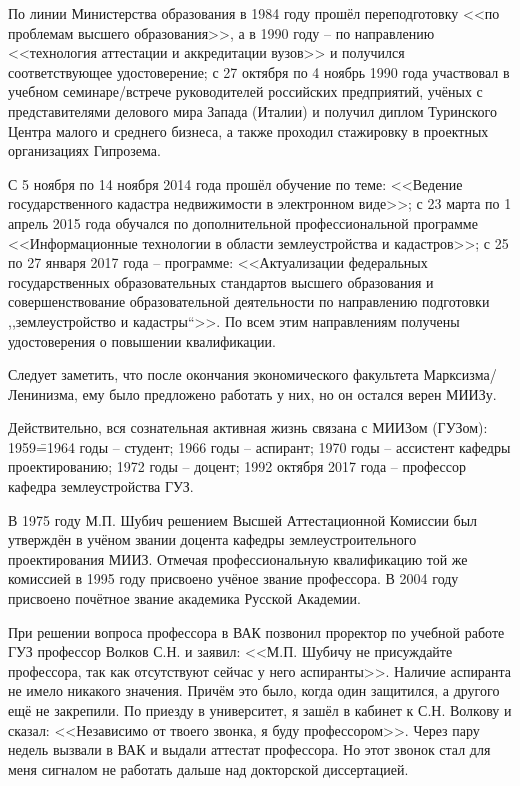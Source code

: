 По линии Министерства образования в 1984 году прошёл переподготовку <<по проблемам высшего образования>>, а в 1990 году \--- по направлению <<технология аттестации и аккредитации вузов>> и получился соответствующее удостоверение; с 27 октября по 4 ноябрь 1990 года участвовал в учебном семинаре\-/встрече руководителей российских предприятий, учёных с представителями делового мира Запада (Италии) и получил диплом Туринского Центра малого и среднего бизнеса, а также проходил стажировку в проектных организациях Гипрозема.

С 5 ноября по 14 ноября 2014 года прошёл обучение по теме: <<Ведение государственного кадастра недвижимости в электронном виде>>; с 23 марта по 1 апрель 2015 года обучался по дополнительной профессиональной программе <<Информационные технологии в области землеустройства и кадастров>>; с 25 по 27 января 2017 года \--- программе: <<Актуализации федеральных государственных образовательных стандартов высшего образования и совершенствование образовательной деятельности по направлению подготовки ,,землеустройство и кадастры``>>. По всем этим направлениям получены удостоверения о повышении квалификации. 

Следует заметить, что после окончания экономического факультета Марксизма\-/Ленинизма, ему было предложено работать у них, но он остался верен МИИЗу.

Действительно, вся сознательная активная жизнь связана с МИИЗом (ГУЗом): 1959\==1964 годы \--- студент; 1966 годы \--- аспирант; 1970 годы \--- ассистент кафедры проектированию; 1972 годы \--- доцент; 1992 октября 2017 года \--- профессор кафедра землеустройства ГУЗ.

В 1975 году М.П. Шубич решением Высшей Аттестационной Комиссии был утверждён в учёном звании доцента кафедры землеустроительного проектирования МИИЗ. Отмечая профессиональную квалификацию той же комиссией в 1995 году присвоено учёное звание профессора. В 2004 году присвоено почётное звание академика Русской Академии.

При решении вопроса профессора в ВАК позвонил проректор по учебной работе ГУЗ профессор Волков С.Н. и заявил: <<М.П. Шубичу не присуждайте профессора, так как отсутствуют сейчас у него аспиранты>>. Наличие аспиранта не имело никакого значения. Причём это было, когда один защитился, а другого ещё не закрепили. По приезду в университет, я зашёл в кабинет к С.Н. Волкову и сказал: <<Независимо от твоего звонка, я буду профессором>>. Через пару недель вызвали в ВАК и выдали аттестат профессора. Но этот звонок стал для меня сигналом не работать дальше над докторской диссертацией.

